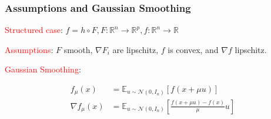 \documentclass{beamer}
\begin{document}
\begin{frame}
  \frametitle{Assumptions and Gaussian Smoothing}
  \textcolor{red}{Structured case}: $f = h \circ F, F: \mathbb{R}^n \to \mathbb{R}^p, f: \mathbb{R}^n \to \mathbb{R}$ \\   \vspace{0.5in}
 
  
	\textcolor{red}{Assumptions}: $F$ smooth, $\nabla F_i$ are lipschitz, $f$ is convex, and $\nabla f$ lipschitz. \newline \vspace{0.25in}
	
	\textcolor{red}{Gaussian Smoothing}: 
	 
  \begin{align*}
  f_{\mu}(x) & = \mathbb{E}_{u \sim \mathcal{N}(0,I_n)}[f(x+\mu u)] \\ \nabla f_{\mu}(x) & = \mathbb{E}_{u \sim \mathcal{N}(0,I_n)}\left[\frac{f(x+\mu u)-f(x)}{\mu}u\right]
  \end{align*}
  
 
\end{frame}
   
\end{document}
